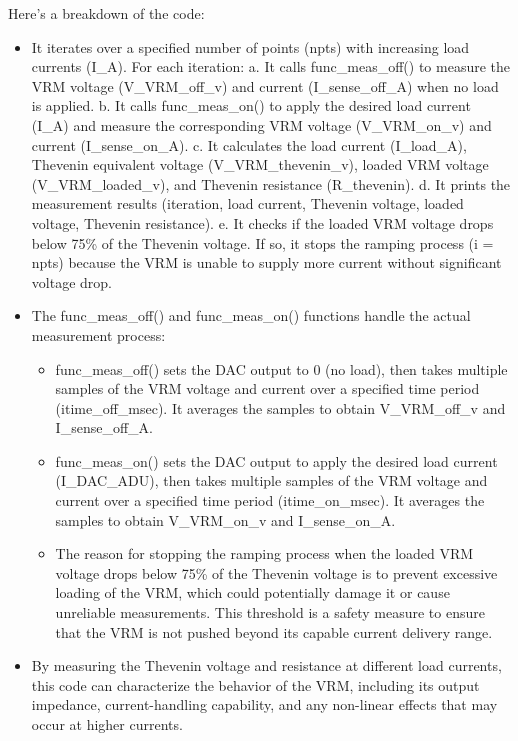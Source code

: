 \documentclass[a4paper,11pt]{article}%
\begin{document}
Here's a breakdown of the code:
\begin{itemize}
  \item It iterates over a specified number of points (npts) with increasing load currents (I\_A).
  For each iteration: a. It calls func\_meas\_off() to measure the VRM voltage (V\_VRM\_off\_v) and current (I\_sense\_off\_A) when no load is applied. b. It calls func\_meas\_on() to apply the desired load current (I\_A) and measure the corresponding VRM voltage (V\_VRM\_on\_v) and current (I\_sense\_on\_A). c. It calculates the load current (I\_load\_A), Thevenin equivalent voltage (V\_VRM\_thevenin\_v), loaded VRM voltage (V\_VRM\_loaded\_v), and Thevenin resistance (R\_thevenin). d. It prints the measurement results (iteration, load current, Thevenin voltage, loaded voltage, Thevenin resistance). e. It checks if the loaded VRM voltage drops below 75\% of the Thevenin voltage. If so, it stops the ramping process (i = npts) because the VRM is unable to supply more current without significant voltage drop.
  \item The func\_meas\_off() and func\_meas\_on() functions handle the actual measurement process:
  \begin{itemize}
    \item func\_meas\_off() sets the DAC output to 0 (no load), then takes multiple samples of the VRM voltage and current over a specified time period (itime\_off\_msec). It averages the samples to obtain V\_VRM\_off\_v and I\_sense\_off\_A.
    \item func\_meas\_on() sets the DAC output to apply the desired load current (I\_DAC\_ADU), then takes multiple samples of the VRM voltage and current over a specified time period (itime\_on\_msec). It averages the samples to obtain V\_VRM\_on\_v and I\_sense\_on\_A.
    \item The reason for stopping the ramping process when the loaded VRM voltage drops below 75\% of the Thevenin voltage is to prevent excessive loading of the VRM, which could potentially damage it or cause unreliable measurements. This threshold is a safety measure to ensure that the VRM is not pushed beyond its capable current delivery range.
  \end{itemize}
  
  \item By measuring the Thevenin voltage and resistance at different load currents, this code can characterize the behavior of the VRM, including its output impedance, current-handling capability, and any non-linear effects that may occur at higher currents.
\end{itemize}
\end{document}
